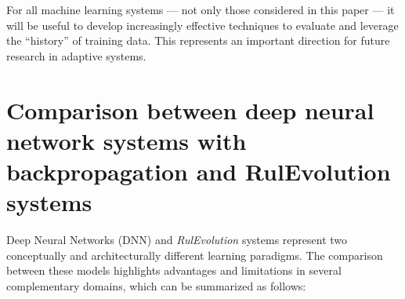 \documentclass[12pt,a4paper]{article}
\begin{document}
For all machine learning systems — not only those considered in this paper — it will be useful to develop increasingly effective techniques to evaluate and leverage the “history” of training data.  
This represents an important direction for future research in adaptive systems.


\section{Comparison between deep neural network systems with backpropagation and RulEvolution systems}

Deep Neural Networks (DNN) and \textit{RulEvolution} systems represent two conceptually and architecturally different learning paradigms.  
The comparison between these models highlights advantages and limitations in several complementary domains, which can be summarized as follows:
\end{document}
